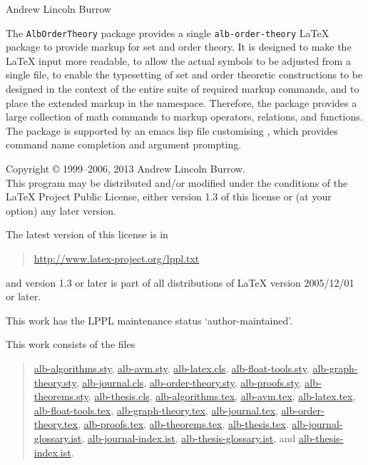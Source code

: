 \documentclass[11pt,a4paper,oneside]{alb-latex}
\begin{document}


\begin{albTitlePage}


  Andrew Lincoln Burrow


  The \texttt{AlbOrderTheory} package provides a single
  \texttt{alb-order-theory} \LaTeX{} package to provide markup for set
  and order theory.  It is designed to make the \LaTeX{} input more
  readable, to allow the actual symbols to be adjusted from a single
  file, to enable the typesetting of set and order theoretic
  constructions to be designed in the context of the entire suite of
  required markup commands, and to place the extended markup in the
  \albLogo{} namespace.  Therefore, the package provides a large
  collection of math commands to markup operators, relations, and
  functions.  The package is supported by an emacs lisp file customising
  \AUCTeX{}, which provides command name completion and argument
  prompting.



  Copyright \copyright{} 1999--2006, 2013 Andrew Lincoln Burrow.\\
  This program may be distributed and/or modified under the conditions
  of the \LaTeX{} Project Public License, either version 1.3 of this
  license or (at your option) any later version.

  \medskip{}

  The latest version of this license is in
  \begin{quote}
    \url{http://www.latex-project.org/lppl.txt}
  \end{quote}
  and version 1.3 or later is part of all distributions of LaTeX version
  2005/12/01 or later.

  \medskip{}

  This work has the LPPL maintenance status `author-maintained'.

  \medskip{}

  This work consists of the files
  \begin{quote}
    \begin{flushleft}
      \url{alb-algorithms.sty}, \url{alb-avm.sty}, \url{alb-latex.cls},
      \url{alb-float-tools.sty}, \url{alb-graph-theory.sty},
      \url{alb-journal.cls}, \url{alb-order-theory.sty},
      \url{alb-proofs.sty}, \url{alb-theorems.sty},
      \url{alb-thesis.cls}, \url{alb-algorithms.tex}, \url{alb-avm.tex},
      \url{alb-latex.tex}, \url{alb-float-tools.tex},
      \url{alb-graph-theory.tex}, \url{alb-journal.tex},
      \url{alb-order-theory.tex}, \url{alb-proofs.tex},
      \url{alb-theorems.tex}, \url{alb-thesis.tex}.
      \url{alb-journal-glossary.ist}, \url{alb-journal-index.ist},
      \url{alb-thesis-glossary.ist}, and \url{alb-thesis-index.ist}.
    \end{flushleft}
  \end{quote}



\end{albTitlePage}
\end{document}

